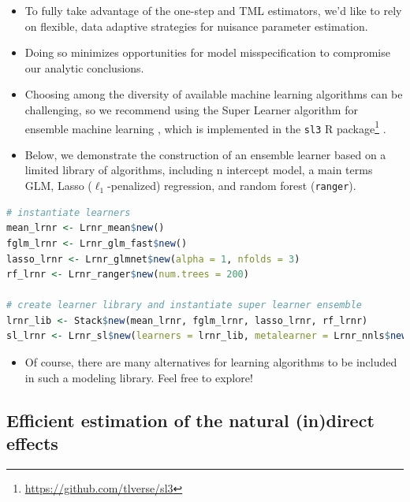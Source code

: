 \documentclass[
  12pt,
]{book}
\newcommand{\passthrough}[1]{#1}
\providecommand{\tightlist}{%
  \setlength{\itemsep}{0pt}\setlength{\parskip}{0pt}}
\renewcommand{\href}[2]{#2\footnote{\url{#1}}}
\theoremstyle{definition}
\theoremstyle{definition}
\theoremstyle{definition}
\newcommand{\1}{\mathbbm{1}}
\begin{document}
\begin{itemize}
\tightlist
\item
  To fully take advantage of the one-step and TML estimators, we'd like to rely
  on flexible, data adaptive strategies for nuisance parameter estimation.
\item
  Doing so minimizes opportunities for model misspecification to compromise our
  analytic conclusions.
\item
  Choosing among the diversity of available machine learning algorithms can be
  challenging, so we recommend using the Super Learner algorithm for ensemble
  machine learning \citep{vdl2007super}, which is implemented in the \href{https://github.com/tlverse/sl3}{\passthrough{\lstinline!sl3!} R
  package} \citep{coyle2022sl3}.
\item
  Below, we demonstrate the construction of an ensemble learner based on a
  limited library of algorithms, including n intercept model, a main terms GLM,
  Lasso (\(\ell_1\)-penalized) regression, and random forest (\passthrough{\lstinline!ranger!}).
\end{itemize}

\begin{lstlisting}[language=R]
# instantiate learners
mean_lrnr <- Lrnr_mean$new()
fglm_lrnr <- Lrnr_glm_fast$new()
lasso_lrnr <- Lrnr_glmnet$new(alpha = 1, nfolds = 3)
rf_lrnr <- Lrnr_ranger$new(num.trees = 200)

# create learner library and instantiate super learner ensemble
lrnr_lib <- Stack$new(mean_lrnr, fglm_lrnr, lasso_lrnr, rf_lrnr)
sl_lrnr <- Lrnr_sl$new(learners = lrnr_lib, metalearner = Lrnr_nnls$new())
\end{lstlisting}

\begin{itemize}
\tightlist
\item
  Of course, there are many alternatives for learning algorithms to be included
  in such a modeling library. Feel free to explore!
\end{itemize}

\hypertarget{efficient-estimation-of-the-natural-indirect-effects}{%
\subsection{Efficient estimation of the natural (in)direct effects}\label{efficient-estimation-of-the-natural-indirect-effects}}
\end{document}
